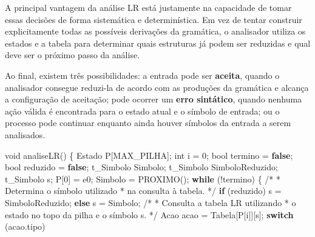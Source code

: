 \documentclass[
  brazilian,
  letterpaper,
]{book}
\newenvironment{Shaded}{\begin{snugshade}}{\end{snugshade}}
\newcommand{\CommentTok}[1]{\textcolor[rgb]{0.37,0.37,0.37}{#1}}
\newcommand{\ControlFlowTok}[1]{\textcolor[rgb]{0.00,0.23,0.31}{\textbf{#1}}}
\newcommand{\DataTypeTok}[1]{\textcolor[rgb]{0.68,0.00,0.00}{#1}}
\newcommand{\DecValTok}[1]{\textcolor[rgb]{0.68,0.00,0.00}{#1}}
\newcommand{\KeywordTok}[1]{\textcolor[rgb]{0.00,0.23,0.31}{\textbf{#1}}}
\newcommand{\NormalTok}[1]{\textcolor[rgb]{0.00,0.23,0.31}{#1}}
\newcommand{\OperatorTok}[1]{\textcolor[rgb]{0.37,0.37,0.37}{#1}}
\theoremstyle{plain}
\theoremstyle{definition}
\theoremstyle{remark}
\begin{document}
A principal vantagem da análise LR está justamente na capacidade de
tomar essas decisões de forma sistemática e determinística. Em vez de
tentar construir explicitamente todas as possíveis derivações da
gramática, o analisador utiliza os estados e a tabela para determinar
quais estruturas já podem ser reduzidas e qual deve ser o próximo passo
da análise.

Ao final, existem três possibilidades: a entrada pode ser
\textbf{aceita}, quando o analisador consegue reduzi-la de acordo com as
produções da gramática e alcança a configuração de aceitação; pode
ocorrer um \textbf{erro sintático}, quando nenhuma ação válida é
encontrada para o estado atual e o símbolo de entrada; ou o processo
pode continuar enquanto ainda houver símbolos da entrada a serem
analisados.

\begin{Shaded}
\begin{Highlighting}[]
\DataTypeTok{void}\NormalTok{ analiseLR}\OperatorTok{()}
\OperatorTok{\{}
\NormalTok{    Estado P}\OperatorTok{[}\NormalTok{MAX\_PILHA}\OperatorTok{];}
    \DataTypeTok{int}\NormalTok{ i }\OperatorTok{=} \DecValTok{0}\OperatorTok{;}
    \DataTypeTok{bool}\NormalTok{ termino }\OperatorTok{=} \KeywordTok{false}\OperatorTok{;}
    \DataTypeTok{bool}\NormalTok{ reduzido }\OperatorTok{=} \KeywordTok{false}\OperatorTok{;}
\NormalTok{    t\_Simbolo Simbolo}\OperatorTok{;}
\NormalTok{    t\_Simbolo SimboloReduzido}\OperatorTok{;}
\NormalTok{    t\_Simbolo s}\OperatorTok{;}
\NormalTok{    P}\OperatorTok{[}\DecValTok{0}\OperatorTok{]} \OperatorTok{=}\NormalTok{ e0}\OperatorTok{;}
\NormalTok{    Simbolo }\OperatorTok{=}\NormalTok{ PROXIMO}\OperatorTok{();}
    \ControlFlowTok{while} \OperatorTok{(!}\NormalTok{termino}\OperatorTok{)}
    \OperatorTok{\{}
        \CommentTok{/*}
\CommentTok{         * Determina o símbolo utilizado}
\CommentTok{         * na consulta à tabela.}
\CommentTok{         */}
        \ControlFlowTok{if} \OperatorTok{(}\NormalTok{reduzido}\OperatorTok{)}
\NormalTok{            s }\OperatorTok{=}\NormalTok{ SimboloReduzido}\OperatorTok{;}
        \ControlFlowTok{else}
\NormalTok{            s }\OperatorTok{=}\NormalTok{ Simbolo}\OperatorTok{;}
        \CommentTok{/*}
\CommentTok{         * Consulta a tabela LR utilizando}
\CommentTok{         * o estado no topo da pilha e o símbolo s.}
\CommentTok{         */}
\NormalTok{        Acao acao }\OperatorTok{=}\NormalTok{ Tabela}\OperatorTok{[}\NormalTok{P}\OperatorTok{[}\NormalTok{i}\OperatorTok{]][}\NormalTok{s}\OperatorTok{];}
        \ControlFlowTok{switch} \OperatorTok{(}\NormalTok{acao}\OperatorTok{.}\NormalTok{tipo}\OperatorTok{)}

\end{Highlighting}
\end{Shaded}
\end{document}
